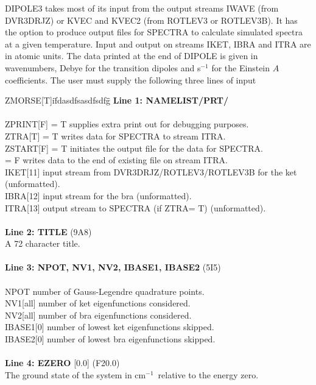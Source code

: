 \documentclass{elsart}
\def\cm{{cm$^{-1}$}}
\begin{document}
DIPOLE3 takes most of its input from the output streams IWAVE (from DVR3DRJZ) or
KVEC and KVEC2 (from ROTLEV3 or ROTLEV3B).  It has the option to produce output
files for
SPECTRA \cite{jt128} to calculate simulated spectra at a given temperature.
Input and output on streams IKET, IBRA and ITRA are in atomic units.
The data printed
at the end of DIPOLE is given in wavenumbers, Debye for the transition dipoles
and s$^{-1}$ for the Einstein $A$ coefficients.
The user must supply the following three lines of input
\vskip 0.2cm
\begin{tabbing}
ZMORSE[T]i\=    fdasdfsasdfsdfg\=   \=             \kill
{\bf Line 1: NAMELIST/PRT/}\\
\\
ZPRINT[F] \> = T supplies extra print out for debugging purposes.\\
ZTRA[T] \> = T writes data for SPECTRA to stream ITRA.\\
ZSTART[F] \> = T initiates the output file for the data for SPECTRA.\\
    \> = F writes data to the end of existing file on stream ITRA.\\
IKET[11] \> input stream from DVR3DRJZ/ROTLEV3/ROTLEV3B for the ket
(unformatted).\\
IBRA[12] \>  input stream for the bra (unformatted).\\
ITRA[13] \>  output stream to SPECTRA (if ZTRA= T) (unformatted).\\
\\
{\bf Line 2: TITLE} (9A8)\\
A 72 character title.\\
\\
{\bf Line 3: NPOT, NV1, NV2, IBASE1, IBASE2} (5I5)\\
\\
NPOT \> number of Gauss-Legendre quadrature points.\\
NV1[all] \> number of ket eigenfunctions considered.\\
NV2[all] \> number of bra eigenfunctions considered.\\
IBASE1[0] \> number of lowest ket eigenfunctions skipped.\\
IBASE2[0] \> number of lowest bra eigenfunctions skipped.\\
\\
{\bf Line 4: EZERO} [0.0] (F20.0)\\
The ground state of the system in \cm\ relative to the energy zero. \\
\end{tabbing}
\end{document}
